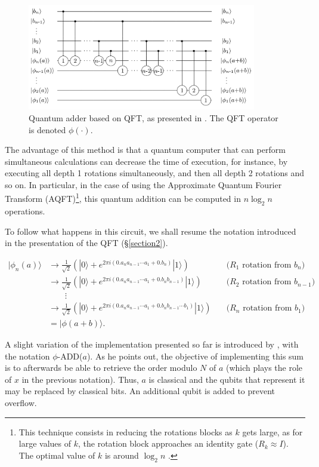 \documentclass[a4paper, 10pt]{article}
\numberwithin{equation}{section}
\numberwithin{figure}{section}
\numberwithin{table}{section}
\begin{document}
\begin{figure}[h!]
	\centering
	\includegraphics[width=10cm]{Figures/adder1}
	\caption{Quantum adder based on QFT, as presented in \cite{draper}. The QFT operator is denoted $\phi(\cdot)$.}
	\label{fig-adder}
\end{figure}

The advantage of this method is that a quantum computer that can perform simultaneous calculations can decrease the time of execution, for instance, by executing all depth 1 rotations simultaneously, and then all depth 2 rotations and so on. In particular, in the case of using the Approximate Quantum Fourier Transform (AQFT)\footnote{This technique consists in reducing the rotations blocks as $k$ gets large, as for large values of $k$, the rotation block approaches an identity gate ($R_k \approx I$). The optimal value of $k$ is around $\log_2n$ \cite{draper}.}, this quantum addition can be computed in $n\log_2n$ operations.

To follow what happens in this circuit, we shall resume the notation introduced in the presentation of the QFT (\S \ref{section2}).

\begin{align*}
	|\phi_n(a)\rangle &\rightarrow \frac{1}{\sqrt{2}}\left(|0\rangle+e^{2\pi i(0.a_na_{n-1}\cdots a_1+0.b_n)}|1\rangle\right)\quad&\text{($R_1$ rotation from $b_n$)}\\
					  &\rightarrow \frac{1}{\sqrt{2}}\left(|0\rangle+e^{2\pi i(0.a_na_{n-1}\cdots a_1+0.b_nb_{n-1})}|1\rangle\right)\quad&\text{($R_2$ rotation from $b_{n-1}$)}\\
					  &\qquad \vdots\\
					  &\rightarrow \frac{1}{\sqrt{2}}\left(|0\rangle+e^{2\pi i(0.a_na_{n-1}\cdots a_1+0.b_nb_{n-1}\cdots b_1)}|1\rangle\right)\quad&\text{($R_n$ rotation from $b_1$)}\\
					  & = |\phi(a+b)\rangle.
\end{align*}

A slight variation of the implementation presented so far is introduced by \cite{beauregard}, with the notation $\phi$-ADD($a$). As he points out, the objective of implementing this sum is to afterwards be able to retrieve the order modulo $N$ of $a$ (which plays the role of $x$ in the previous notation). Thus, $a$ is classical and the qubits that represent it may be replaced by classical bits. An additional qubit is added to prevent overflow.
\end{document}
